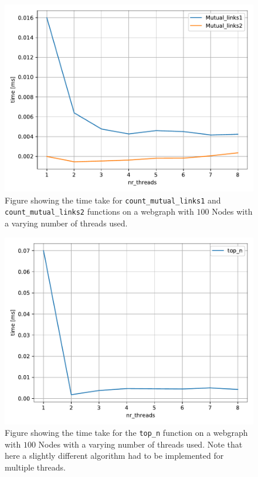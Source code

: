 \documentclass[onecolumn]{aastex62}
\begin{document}
\begin{figure}
    \includegraphics[scale=0.8]{figures/mutuallinks.pdf}
    \caption{Figure showing the time take for \texttt{count\_mutual\_links1} and \texttt{count\_mutual\_links2} functions on a webgraph with $100$ Nodes with a varying number of threads used.}
    \label{fig:mutuallinks}
\end{figure}
\begin{figure}
    \includegraphics[scale=0.8]{figures/top_n.pdf}
    \caption{Figure showing the time take for the \texttt{top\_n} function on a webgraph with $100$ Nodes with a varying number of threads used. Note that here a slightly different algorithm had to be implemented for multiple threads.}
    \label{fig:top_n}
\end{figure}
\end{document}
